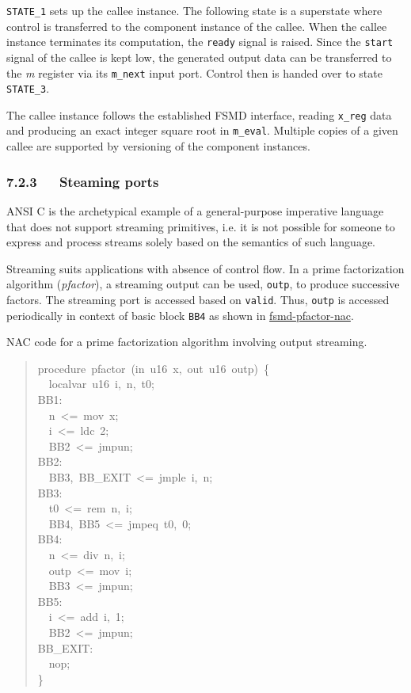 \documentclass[a4paper]{article}
\begin{document}
\texttt{STATE\_1} sets up the callee instance. The following state is a superstate
where control is transferred to the component instance of the callee. When
the callee instance terminates its computation, the \texttt{ready} signal is raised.
Since the \texttt{start} signal of the callee is kept low, the generated output data
can be transferred to the \emph{m} register via its \texttt{m\_next} input port. Control
then is handed over to state \texttt{STATE\_3}.

The callee instance follows the established FSMD interface, reading \texttt{x\_reg}
data and producing an exact integer square root in \texttt{m\_eval}. Multiple copies
of a given callee are supported by versioning of the component instances.


\subsubsection{7.2.3~~~Steaming ports%
  \label{steaming-ports}%
}

ANSI C is the archetypical example of a general-purpose imperative language that
does not support streaming primitives, i.e. it is not possible for someone to
express and process streams solely based on the semantics of such language.

Streaming suits applications with absence of control flow. In a prime
factorization algorithm (\emph{pfactor}), a streaming output can be used, \texttt{outp},
to produce successive factors. The streaming port is accessed based on
\texttt{valid}. Thus, \texttt{outp} is accessed periodically in context of basic block
\texttt{BB4} as shown in \hyperref[fsmd-pfactor-nac]{fsmd-pfactor-nac}.

\label{fsmd-pfactor-nac}
NAC code for a prime factorization algorithm involving output streaming.
%
\begin{quote}{\ttfamily \raggedright \noindent
procedure~pfactor~(in~u16~x,~out~u16~outp)~\{\\
~~localvar~u16~i,~n,~t0;\\
BB1:\\
~~n~<=~mov~x;\\
~~i~<=~ldc~2;\\
~~BB2~<=~jmpun;\\
BB2:\\
~~BB3,~BB\_EXIT~<=~jmple~i,~n;\\
BB3:\\
~~t0~<=~rem~n,~i;\\
~~BB4,~BB5~<=~jmpeq~t0,~0;\\
BB4:\\
~~n~<=~div~n,~i;\\
~~outp~<=~mov~i;\\
~~BB3~<=~jmpun;\\
BB5:\\
~~i~<=~add~i,~1;\\
~~BB2~<=~jmpun;\\
BB\_EXIT:\\
~~nop;\\
\}
}
\end{quote}
\end{document}
